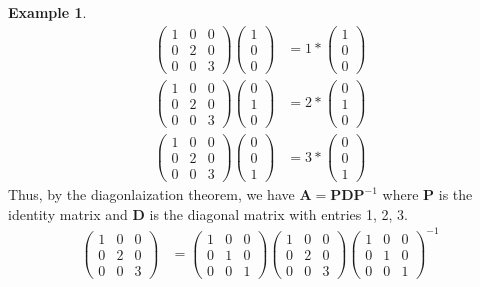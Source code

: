 \documentclass[
]{book}
\theoremstyle{definition}
\theoremstyle{definition}
\newtheorem{example}{Example}[chapter]
\theoremstyle{definition}
\theoremstyle{definition}
\theoremstyle{remark}
\begin{document}
\begin{example}
\[
\begin{aligned}
\begin{pmatrix} 1 & 0 & 0 \\ 0 & 2 & 0 \\ 0 & 0 & 3 \end{pmatrix} \begin{pmatrix} 1 \\ 0 \\ 0 \end{pmatrix} & = 1 * \begin{pmatrix} 1 \\ 0 \\ 0 \end{pmatrix} \\
\begin{pmatrix} 1 & 0 & 0 \\ 0 & 2 & 0 \\ 0 & 0 & 3 \end{pmatrix} \begin{pmatrix} 0 \\ 1 \\ 0 \end{pmatrix} & = 2 * \begin{pmatrix} 0 \\ 1 \\ 0 \end{pmatrix} \\
\begin{pmatrix} 1 & 0 & 0 \\ 0 & 2 & 0 \\ 0 & 0 & 3 \end{pmatrix} \begin{pmatrix} 0 \\ 0 \\ 1 \end{pmatrix} & = 3 * \begin{pmatrix} 0 \\ 0 \\ 1 \end{pmatrix} 
\end{aligned}
\]
Thus, by the diagonlaization theorem, we have \(\mathbf{A} = \mathbf{P} \mathbf{D} \mathbf{P}^{-1}\) where \(\mathbf{P}\) is the identity matrix and \(\mathbf{D}\) is the diagonal matrix with entries 1, 2, 3.
\[
\begin{aligned}
\begin{pmatrix} 1 & 0 & 0 \\ 0 & 2 & 0 \\ 0 & 0 & 3 \end{pmatrix} & = \begin{pmatrix} 1 & 0 & 0 \\ 0 & 1 & 0 \\ 0 & 0 & 1 \end{pmatrix} \begin{pmatrix} 1 & 0 & 0 \\ 0 & 2 & 0 \\ 0 & 0 & 3 \end{pmatrix} \begin{pmatrix} 1 & 0 & 0 \\ 0 & 1 & 0 \\ 0 & 0 & 1 \end{pmatrix}^{-1}

\end{aligned}\]
\end{example}
\end{document}
